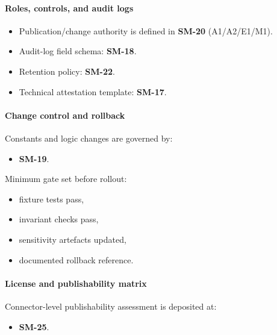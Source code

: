 \documentclass[
  11pt,
  peerreview,journal,onecolumn]{IEEEtran}
\providecommand{\tightlist}{%
  \setlength{\itemsep}{0pt}\setlength{\parskip}{0pt}}
\begin{document}
\hypertarget{roles-controls-and-audit-logs}{%
\paragraph{Roles, controls, and audit
logs}\label{roles-controls-and-audit-logs}}

\begin{itemize}
\tightlist
\item
  Publication/change authority is defined in \textbf{SM-20}
  (A1/A2/E1/M1).
\item
  Audit-log field schema: \textbf{SM-18}.
\item
  Retention policy: \textbf{SM-22}.
\item
  Technical attestation template: \textbf{SM-17}.
\end{itemize}

\hypertarget{change-control-and-rollback}{%
\paragraph{Change control and
rollback}\label{change-control-and-rollback}}

Constants and logic changes are governed by:

\begin{itemize}
\tightlist
\item
  \textbf{SM-19}.
\end{itemize}

Minimum gate set before rollout:

\begin{itemize}
\tightlist
\item
  fixture tests pass,
\item
  invariant checks pass,
\item
  sensitivity artefacts updated,
\item
  documented rollback reference.
\end{itemize}

\hypertarget{license-and-publishability-matrix}{%
\paragraph{License and publishability
matrix}\label{license-and-publishability-matrix}}

Connector-level publishability assessment is deposited at:

\begin{itemize}
\tightlist
\item
  \textbf{SM-25}.
\end{itemize}
\end{document}
